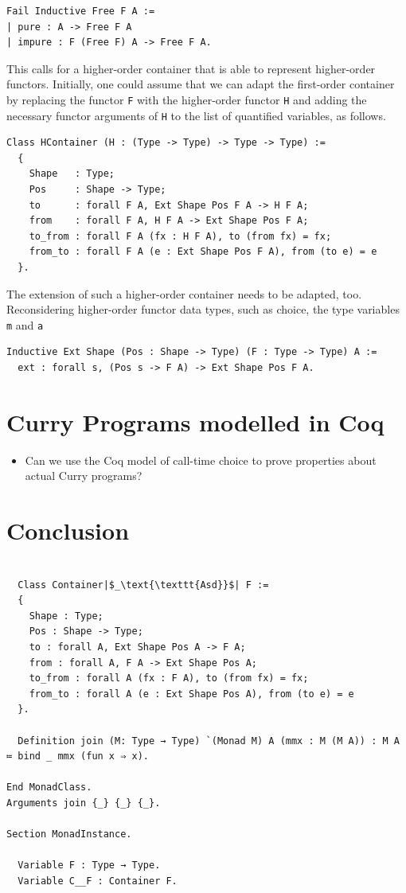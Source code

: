 \documentclass[a4paper, 11pt, fleqn, twoside]{scrreprt}
\newcommand{\hinl}[1]{\texttt{#1}}
\newcommand{\cinl}[1]{\texttt{#1}}
\begin{document}
\begin{verbatim}
Fail Inductive Free F A :=
| pure : A -> Free F A
| impure : F (Free F) A -> Free F A.
\end{verbatim}

This calls for a higher-order container that is able to represent higher-order functors.
Initially, one could assume that we can adapt the first-order container by replacing the functor \cinl{F} with the higher-order functor \cinl{H} and adding the necessary functor arguments of \cinl{H} to the list of quantified variables, as follows.

\begin{verbatim}
Class HContainer (H : (Type -> Type) -> Type -> Type) :=
  {
    Shape   : Type;
    Pos     : Shape -> Type;
    to      : forall F A, Ext Shape Pos F A -> H F A;
    from    : forall F A, H F A -> Ext Shape Pos F A;
    to_from : forall F A (fx : H F A), to (from fx) = fx;
    from_to : forall F A (e : Ext Shape Pos F A), from (to e) = e
  }.
\end{verbatim}

The extension of such a higher-order container needs to be adapted, too.
Reconsidering higher-order functor data types, such as choice, the type variables \hinl{m} and \hinl{a}

\begin{verbatim}
Inductive Ext Shape (Pos : Shape -> Type) (F : Type -> Type) A := 
  ext : forall s, (Pos s -> F A) -> Ext Shape Pos F A.
\end{verbatim}

\chapter{Curry Programs modelled in Coq}
\begin{itemize}
\item Can we use the Coq model of call-time choice to prove properties about actual Curry programs?
\end{itemize}

\chapter{Conclusion}

\begin{verbatim}

  Class Container|$_\text{\texttt{Asd}}$| F :=
  {
    Shape : Type;
    Pos : Shape -> Type;
    to : forall A, Ext Shape Pos A -> F A;
    from : forall A, F A -> Ext Shape Pos A;
    to_from : forall A (fx : F A), to (from fx) = fx;
    from_to : forall A (e : Ext Shape Pos A), from (to e) = e
  }.

  Definition join (M: Type → Type) `(Monad M) A (mmx : M (M A)) : M A ≔ bind _ mmx (fun x ⇒ x).

End MonadClass.
Arguments join {_} {_} {_}.

Section MonadInstance.

  Variable F : Type → Type.
  Variable C__F : Container F.


\end{verbatim}



\appendix
\end{document}
